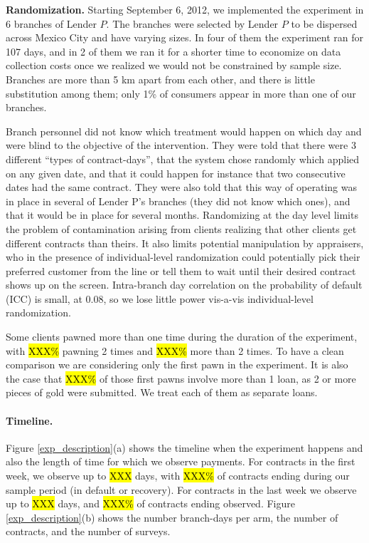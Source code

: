 \documentclass[oneside,11pt]{article}
\begin{document}
\vspace{.2in}
\noindent \textbf{Randomization.}  Starting September 6, 2012, we implemented the experiment in 6 branches of Lender $P$. The branches were selected by Lender $P$ to be dispersed across Mexico City and have varying sizes. In four of them the experiment ran for 107 days, and in 2 of them we ran it for a shorter time to economize on data collection costs once we realized we would not be constrained by sample size. %
Branches are more than 5 km apart from each other, and there is little substitution among them; only 1\% of consumers appear in more than one of our branches.

Branch personnel did not know which treatment would happen on which day and were blind to the objective of the intervention. They were told that there were 3 different ``types of contract-days'', that the system chose randomly which applied on any given date, and that it could happen for instance that two consecutive dates had the same contract. They were also told that this way of operating was in place in several of Lender P's branches (they did not know which ones), and that it would be in place for several months. Randomizing at the day level limits the problem of contamination arising from clients realizing that other clients get different contracts than theirs. It also limits potential manipulation by appraisers, who in the presence of individual-level randomization could potentially pick their preferred customer from the line or tell them to wait until their desired contract shows up on the screen. Intra-branch day correlation on the probability of default (ICC) is small, at {0.08}, so we lose little power vis-a-vis individual-level randomization.



Some clients pawned more than one time during the duration of the experiment, with \hl{XXX\%} pawning 2 times and \hl{XXX\%} more than 2 times. To have a clean comparison we are considering only the first pawn in the experiment. It is also the case that \hl{XXX\%} of those first pawns involve more than 1 loan, as 2 or more pieces of gold were submitted. We treat each of them as separate loans.


\paragraph{Timeline.} Figure \ref{exp_description}(a) shows the timeline when the experiment happens and also the length of time for which we observe payments. For contracts in the first week, we observe up to \hl{XXX} days, with \hl{XXX\%} of contracts ending during our sample period (in default or recovery). For contracts in the last week we observe up to \hl{XXX} days, and \hl{XXX\%} of contracts ending observed. Figure \ref{exp_description}(b) shows the number branch-days per arm, the number of contracts, and the number of surveys. %
\end{document}
